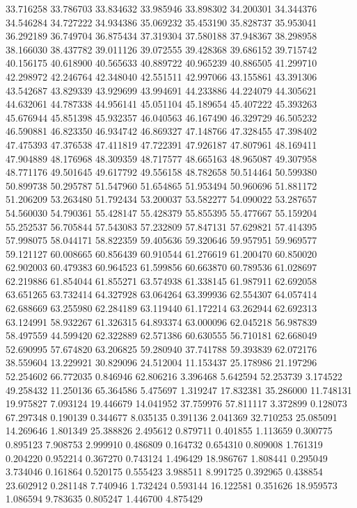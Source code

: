 33.716258
33.786703
33.834632
33.985946
33.898302
34.200301
34.344376
34.546284
34.727222
34.934386
35.069232
35.453190
35.828737
35.953041
36.292189
36.749704
36.875434
37.319304
37.580188
37.948367
38.298958
38.166030
38.437782
39.011126
39.072555
39.428368
39.686152
39.715742
40.156175
40.618900
40.565633
40.889722
40.965239
40.886505
41.299710
42.298972
42.246764
42.348040
42.551511
42.997066
43.155861
43.391306
43.542687
43.829339
43.929699
43.994691
44.233886
44.224079
44.305621
44.632061
44.787338
44.956141
45.051104
45.189654
45.407222
45.393263
45.676944
45.851398
45.932357
46.040563
46.167490
46.329729
46.505232
46.590881
46.823350
46.934742
46.869327
47.148766
47.328455
47.398402
47.475393
47.376538
47.411819
47.722391
47.926187
47.807961
48.169411
47.904889
48.176968
48.309359
48.717577
48.665163
48.965087
49.307958
48.771176
49.501645
49.617792
49.556158
48.782658
50.514464
50.599380
50.899738
50.295787
51.547960
51.654865
51.953494
50.960696
51.881172
51.206209
53.263480
51.792434
53.200037
53.582277
54.090022
53.287657
54.560030
54.790361
55.428147
55.428379
55.855395
55.477667
55.159204
55.252537
56.705844
57.543083
57.232809
57.847131
57.629821
57.414395
57.998075
58.044171
58.822359
59.405636
59.320646
59.957951
59.969577
59.121127
60.008665
60.856439
60.910544
61.276619
61.200470
60.850020
62.902003
60.479383
60.964523
61.599856
60.663870
60.789536
61.028697
62.219886
61.854044
61.855271
63.574938
61.338145
61.987911
62.692058
63.651265
63.732414
64.327928
63.064264
63.399936
62.554307
64.057414
62.688669
63.255980
62.284189
63.119440
61.172214
63.262944
62.692313
63.124991
58.932267
61.326315
64.893374
63.000096
62.045218
56.987839
58.497559
44.599420
62.322889
62.571386
60.630555
56.710181
62.668049
52.690995
57.674820
63.206825
59.280940
37.741788
59.393839
62.072176
38.559604
13.229921
30.829096
24.512004
11.153437
25.178986
21.197296
52.254602
66.772035
0.846946
62.806216
3.396468
5.642594
52.253739
3.174522
49.258432
11.250136
65.364586
5.475697
1.319247
17.832381
35.286000
11.748131
19.975827
7.093124
19.446679
14.041952
37.759976
57.811117
3.372899
0.128073
67.297348
0.190139
0.344677
8.035135
0.391136
2.041369
32.710253
25.085091
14.269646
1.801349
25.388826
2.495612
0.879711
0.401855
1.113659
0.300775
0.895123
7.908753
2.999910
0.486809
0.164732
0.654310
0.809008
1.761319
0.204220
0.952214
0.367270
0.743124
1.496429
18.986767
1.808441
0.295049
3.734046
0.161864
0.520175
0.555423
3.988511
8.991725
0.392965
0.438854
23.602912
0.281148
7.740946
1.732424
0.593144
16.122581
0.351626
18.959573
1.086594
9.783635
0.805247
1.446700
4.875429
